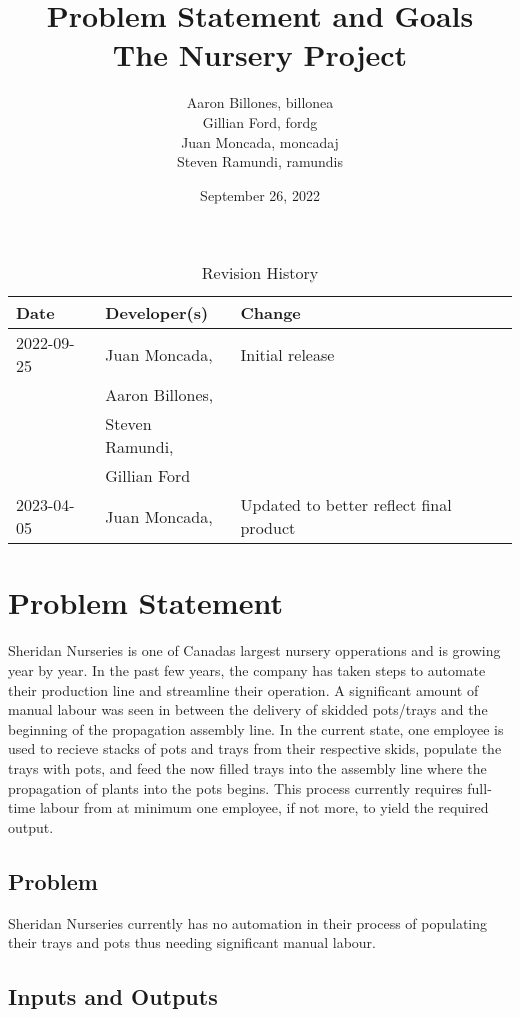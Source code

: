 \documentclass{article}
\title{Problem Statement and Goals\\The Nursery Project}
\author{Aaron Billones, billonea\\Gillian Ford, fordg\\Juan Moncada, moncadaj\\Steven Ramundi, ramundis}
\date{September 26, 2022}
\begin{document}
\maketitle

\begin{table}[hp]
\caption{Revision History} \label{TblRevisionHistory}
\begin{tabularx}{\textwidth}{llX}
\toprule
\textbf{Date} & \textbf{Developer(s)} & \textbf{Change}\\
\midrule
2022-09-25 & Juan Moncada,& Initial release\\&Aaron Billones,\\&Steven Ramundi,\\&Gillian Ford \\
2023-04-05 & Juan Moncada,& Updated to better reflect final product\\
\bottomrule
\end{tabularx}
\end{table}

\newpage

\section{Problem Statement}

Sheridan Nurseries is one of Canadas largest nursery opperations and is growing year by year.
In the past few years, the company has taken steps to automate their production line and streamline their operation.
A significant amount of manual labour was seen in between the delivery of skidded pots/trays and the beginning of the propagation 
assembly line. In the current state, one employee is used to recieve stacks of pots and trays from their respective skids,
populate the trays with pots, and feed the now filled trays into the assembly line where the propagation of plants into the pots begins.
This process currently requires full-time labour from at minimum one employee, if not more, to yield the required output.

\subsection{Problem}
Sheridan Nurseries currently has no automation in their process of populating their 
trays and pots thus needing significant manual labour.

\subsection{Inputs and Outputs}
\end{document}
